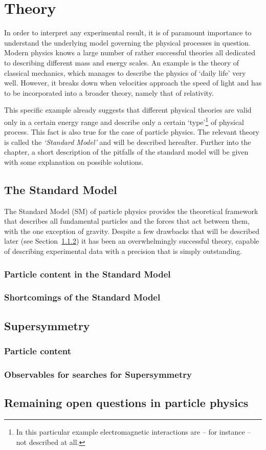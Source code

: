 \chapter{Theory}
\label{ch:theory}
In order to interpret any experimental result, it is of paramount importance to understand
the underlying model governing the physical processes in question. Modern physics knows a
large number of rather successful theories all dedicated to describing different mass and 
energy scales. An example is the theory of classical mechanics, which manages to describe the 
physics of `daily life' very well. However, it breaks down when velocities approach
the speed of light and has to be incorporated into a broader theory, namely that of relativity.

This specific example already suggests that different physical theories are valid only in a 
certain energy range and describe only a certain `type'\footnote{In this particular example
electromagnetic interactions are -- for instance -- not described at all.} of physical process. 
This fact is also true for the case of particle physics. The relevant theory is called the 
\textit{`Standard Model'} and will be described hereafter. Further into the chapter,
a short description of the pitfalls of the standard model will be given with some explanation
on possible solutions.

\section{The Standard Model}
\label{sec:standardmodel}
The Standard Model (SM) of particle physics provides the theoretical framework that
describes all fundamental particles and the forces that act between them, with the one
exception of gravity. Despite a few drawbacks that will be described later (see Section~\ref{sub:sm_shorts})
it has been an overwhelmingly successful theory, capable of describing experimental data
with a precision that is simply outstanding.

\subsection{Particle content in the Standard Model}
\label{sub:sm_particles}
\subsection{Shortcomings of the Standard Model}
\label{sub:sm_shorts}
\section{Supersymmetry}
\label{sec:susy}
\subsection{Particle content}
\label{sub:susy_particles}
\subsection{Observables for searches for Supersymmetry}
\label{sub:susy_observables}
\section{Remaining open questions in particle physics}
\label{sec:theory_remains}
